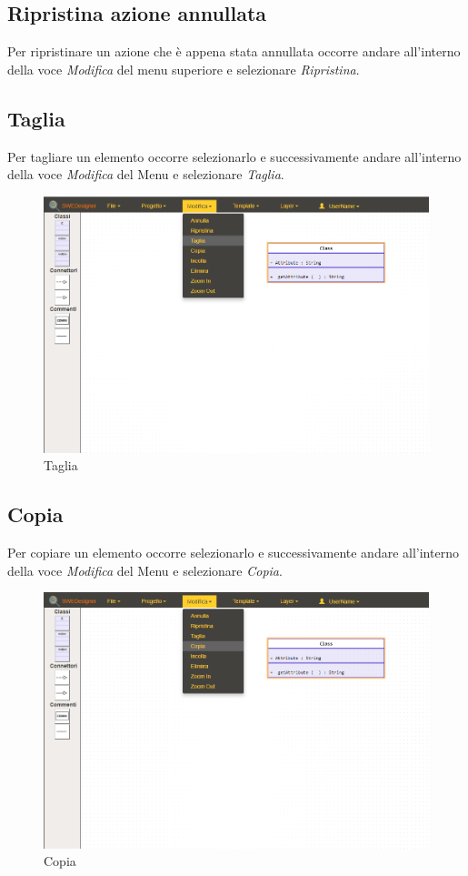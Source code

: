 \subsection{Ripristina azione annullata}
Per ripristinare un azione che è appena stata annullata occorre andare all'interno della voce \textit{Modifica} del menu superiore e selezionare \textit{Ripristina}.

\subsection{Taglia}
Per tagliare un elemento occorre selezionarlo e successivamente andare all'interno della voce \textit{Modifica} del Menu e selezionare \textit{Taglia}.\\
\begin{figure}[H]
	\centering
		\includegraphics[width=1\linewidth]{res/img/taglia.png}
	\caption{Taglia}
\end{figure}
\newpage

\subsection{Copia}
Per copiare un elemento occorre selezionarlo e successivamente andare all'interno della voce \textit{Modifica} del Menu e selezionare \textit{Copia}.\\
\begin{figure}[H]
	\centering
		\includegraphics[width=1\linewidth]{res/img/copia.png}
	\caption{Copia}
\end{figure}
\newpage

